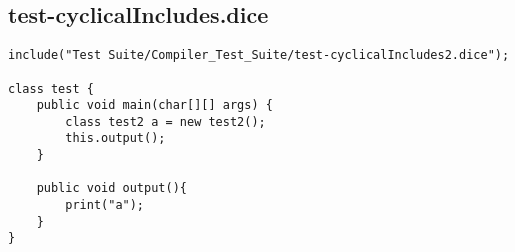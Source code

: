 \subsection{test-cyclicalIncludes.dice}
\begin{verbatim}
include("Test Suite/Compiler_Test_Suite/test-cyclicalIncludes2.dice");

class test {
	public void main(char[][] args) {
        class test2 a = new test2();
        this.output();
	}

	public void output(){
		print("a");
	}
}

\end{verbatim}